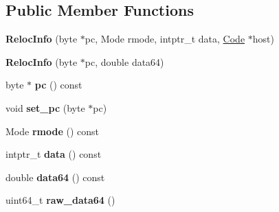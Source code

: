 \subsection*{Public Member Functions}
\begin{DoxyCompactItemize}
\item 
\hypertarget{classv8_1_1internal_1_1_reloc_info_a5a12971387fe33791ad586df9d75b73b}{}{\bfseries Reloc\+Info} (byte $\ast$pc, Mode rmode, intptr\+\_\+t data, \hyperlink{classv8_1_1internal_1_1_code}{Code} $\ast$host)\label{classv8_1_1internal_1_1_reloc_info_a5a12971387fe33791ad586df9d75b73b}

\item 
\hypertarget{classv8_1_1internal_1_1_reloc_info_a7bdea959d1d938e6c3fa43533dcca20e}{}{\bfseries Reloc\+Info} (byte $\ast$pc, double data64)\label{classv8_1_1internal_1_1_reloc_info_a7bdea959d1d938e6c3fa43533dcca20e}

\item 
\hypertarget{classv8_1_1internal_1_1_reloc_info_aa51a0de54cd6ee69318e775b0d696f4e}{}byte $\ast$ {\bfseries pc} () const \label{classv8_1_1internal_1_1_reloc_info_aa51a0de54cd6ee69318e775b0d696f4e}

\item 
\hypertarget{classv8_1_1internal_1_1_reloc_info_ab4d0db4514112f204629a12038067002}{}void {\bfseries set\+\_\+pc} (byte $\ast$pc)\label{classv8_1_1internal_1_1_reloc_info_ab4d0db4514112f204629a12038067002}

\item 
\hypertarget{classv8_1_1internal_1_1_reloc_info_a6557113415d565412e8d880495b86439}{}Mode {\bfseries rmode} () const \label{classv8_1_1internal_1_1_reloc_info_a6557113415d565412e8d880495b86439}

\item 
\hypertarget{classv8_1_1internal_1_1_reloc_info_a3cc9a6deed9b6d5cdc2acad8e1e2ecf7}{}intptr\+\_\+t {\bfseries data} () const \label{classv8_1_1internal_1_1_reloc_info_a3cc9a6deed9b6d5cdc2acad8e1e2ecf7}

\item 
\hypertarget{classv8_1_1internal_1_1_reloc_info_ad66aba86d3a3b5213b5c3d2dbd45ae4e}{}double {\bfseries data64} () const \label{classv8_1_1internal_1_1_reloc_info_ad66aba86d3a3b5213b5c3d2dbd45ae4e}

\item 
\hypertarget{classv8_1_1internal_1_1_reloc_info_a932b9ed9f9ff0e4b3c4c3851d8ca7619}{}uint64\+\_\+t {\bfseries raw\+\_\+data64} ()\label{classv8_1_1internal_1_1_reloc_info_a932b9ed9f9ff0e4b3c4c3851d8ca7619}


\end{DoxyCompactItemize}
